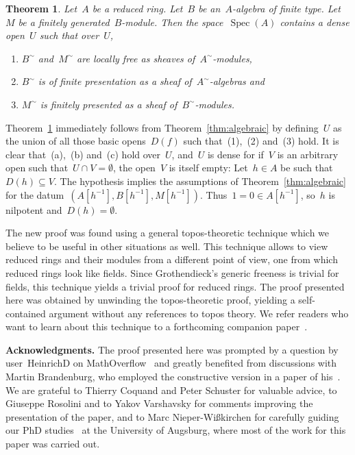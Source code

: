 \documentclass[oneside]{amsart}
\theoremstyle{definition}
\theoremstyle{plain}
\newtheorem{thm}[defn]{Theorem}
\theoremstyle{remark}
\DeclareMathOperator{\Spec}{Spec}
\begin{document}
\begin{thm}\label{thm:geometric}Let~$A$ be a reduced ring. Let~$B$ be
an~$A$-algebra of finite type. Let~$M$ be a finitely generated~$B$-module. Then
the space~$\Spec(A)$ contains a dense open~$U$ such that over~$U$,
\begin{enumerate}
\item[(a)] $B^\sim$ and~$M^\sim$ are locally free as sheaves of~$A^\sim$-modules,
\item[(b)] $B^\sim$ is of finite presentation as a sheaf of~$A^\sim$-algebras and
\item[(c)] $M^\sim$ is finitely presented as a sheaf of~$B^\sim$-modules.
\end{enumerate}
\end{thm}

Theorem~\ref{thm:geometric} immediately follows from
Theorem~\ref{thm:algebraic} by defining~$U$ as the union of all those basic
opens~$D(f)$ such that~(1),~(2) and~(3) hold. It is clear that~(a),~(b)
and~(c) hold over~$U$, and~$U$ is dense for if~$V$ is an arbitrary open
such that~$U \cap V = \emptyset$, the open~$V$ is itself empty: Let~$h \in A$ be
such that~$D(h) \subseteq V$. The hypothesis implies the assumptions of
Theorem~\ref{thm:algebraic} for the datum~$(A[h^{-1}], B[h^{-1}], M[h^{-1}])$.
Thus~$1 = 0 \in A[h^{-1}]$, so~$h$ is nilpotent and~$D(h) = \emptyset$.

The new proof was found using a general topos-theoretic technique which we
believe to be useful in other situations as well. This technique allows to view
reduced rings and their modules from a different point of view, one from which
reduced rings look like fields. Since Grothendieck's generic freeness
is trivial for fields, this technique yields a trivial proof for reduced rings.
The proof presented here was obtained by unwinding the topos-theoretic proof,
yielding a self-contained argument without any references to topos theory.
We refer readers who want to learn about this technique to a forthcoming companion 
paper~\cite{blechschmidt:wlog}.

\textbf{Acknowledgments.} The proof presented here was prompted by a question by
user~HeinrichD on MathOverflow~\cite{mo:kernel} and greatly
benefited from discussions with Martin Brandenburg, who employed the constructive
version in a paper of his~\cite{brandenburg:schur}. We are grateful to Thierry
Coquand and Peter Schuster for valuable advice, to Giuseppe Rosolini and to
Yakov Varshavsky for
comments improving the presentation of the paper, and to Marc
Nieper-Wißkirchen for carefully guiding our PhD studies~\cite{blechschmidt:phd} at the University of
Augsburg, where most of the work for this paper was carried out.
\end{document}
